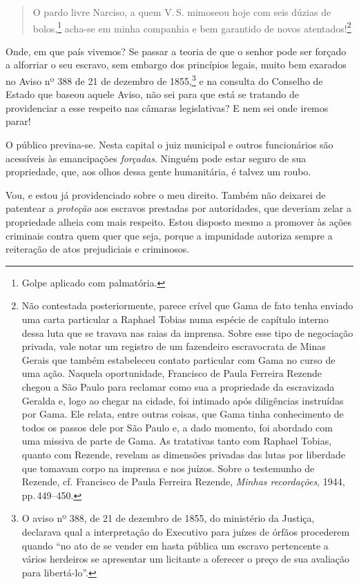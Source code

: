 \begin{quote}
O pardo livre Narciso, a quem V.\,S. mimoseou hoje com seis dúzias de
bolos,\footnote{ Golpe aplicado com palmatória.} acha-se em minha
companhia e bem garantido de novos atentados!\footnote{ Não
  contestada posteriormente, parece crível que Gama de fato tenha
  enviado uma carta particular a Raphael Tobias numa espécie de capítulo
  interno dessa luta que se travava nas raias da imprensa. Sobre esse
  tipo de negociação privada, vale notar um registro de um fazendeiro
  escravocrata de Minas Gerais que também estabeleceu contato particular
  com Gama no curso de uma ação. Naquela oportunidade, Francisco de
  Paula Ferreira Rezende chegou a São Paulo para reclamar como sua a
  propriedade da escravizada Geralda e, logo ao chegar na cidade, foi
  intimado após diligências instruídas por Gama. Ele relata, entre
  outras coisas, que Gama tinha conhecimento de todos os passos dele por
  São Paulo e, a dado momento, foi abordado com uma missiva de parte de
  Gama. As tratativas tanto com Raphael Tobias, quanto com Rezende,
  revelam as dimensões privadas das lutas por liberdade que tomavam
  corpo na imprensa e nos juízos. Sobre o testemunho de Rezende, cf.
  Francisco de Paula Ferreira Rezende, \emph{Minhas recordações}, 1944,
  pp.\,449--450.}
\end{quote}

Onde, em que país vivemos? Se passar a teoria de que o senhor pode ser
forçado a alforriar o seu escravo, sem embargo dos princípios legais,
muito bem exarados no Aviso nº 388 de 21 de dezembro de 1855,\footnote{
  O aviso nº 388, de 21 de dezembro de 1855, do ministério da Justiça, declarava
  qual a interpretação do Executivo para juízes de órfãos procederem
  quando ``no ato de se vender em hasta pública um escravo pertencente a
  vários herdeiros se apresentar um licitante a oferecer o preço de sua
  avaliação para libertá-lo''.} e na consulta do Conselho de Estado que
baseou aquele Aviso, não sei para que está se tratando de providenciar a
esse respeito nas câmaras legislativas? E nem sei onde iremos parar!

O público previna-se. Nesta capital o juiz municipal e outros
funcionários são acessíveis às emancipações \emph{forçadas}. Ninguém
pode estar seguro de sua propriedade, que, aos olhos dessa gente
humanitária, é talvez um roubo.

Vou, e estou já providenciado sobre o meu direito. Também não deixarei
de patentear a \emph{proteção} aos escravos prestadas por autoridades,
que deveriam zelar a propriedade alheia com mais respeito. Estou
disposto mesmo a promover às ações criminais contra quem quer que seja,
porque a impunidade autoriza sempre a reiteração de atos prejudiciais e
criminosos.

